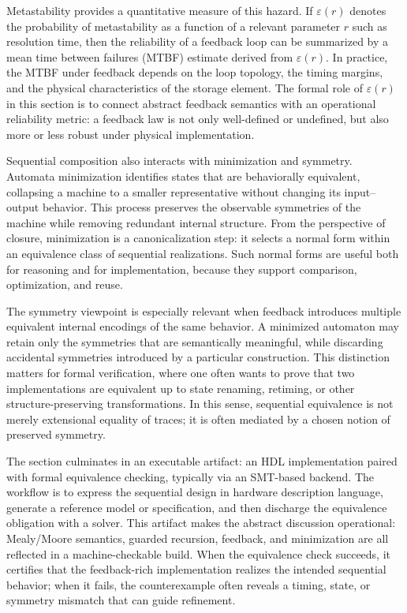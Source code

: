 \documentclass[11pt]{article}
\begin{document}
Metastability provides a quantitative measure of this hazard. If \(\varepsilon(r)\) denotes the probability of metastability as a function of a relevant parameter \(r\) such as resolution time, then the reliability of a feedback loop can be summarized by a mean time between failures (MTBF) estimate derived from \(\varepsilon(r)\). In practice, the MTBF under feedback depends on the loop topology, the timing margins, and the physical characteristics of the storage element. The formal role of \(\varepsilon(r)\) in this section is to connect abstract feedback semantics with an operational reliability metric: a feedback law is not only well-defined or undefined, but also more or less robust under physical implementation.

Sequential composition also interacts with minimization and symmetry. Automata minimization identifies states that are behaviorally equivalent, collapsing a machine to a smaller representative without changing its input--output behavior. This process preserves the observable symmetries of the machine while removing redundant internal structure. From the perspective of closure, minimization is a canonicalization step: it selects a normal form within an equivalence class of sequential realizations. Such normal forms are useful both for reasoning and for implementation, because they support comparison, optimization, and reuse.

The symmetry viewpoint is especially relevant when feedback introduces multiple equivalent internal encodings of the same behavior. A minimized automaton may retain only the symmetries that are semantically meaningful, while discarding accidental symmetries introduced by a particular construction. This distinction matters for formal verification, where one often wants to prove that two implementations are equivalent up to state renaming, retiming, or other structure-preserving transformations. In this sense, sequential equivalence is not merely extensional equality of traces; it is often mediated by a chosen notion of preserved symmetry.

The section culminates in an executable artifact: an HDL implementation paired with formal equivalence checking, typically via an SMT-based backend. The workflow is to express the sequential design in hardware description language, generate a reference model or specification, and then discharge the equivalence obligation with a solver. This artifact makes the abstract discussion operational: Mealy/Moore semantics, guarded recursion, feedback, and minimization are all reflected in a machine-checkable build. When the equivalence check succeeds, it certifies that the feedback-rich implementation realizes the intended sequential behavior; when it fails, the counterexample often reveals a timing, state, or symmetry mismatch that can guide refinement.
\end{document}
